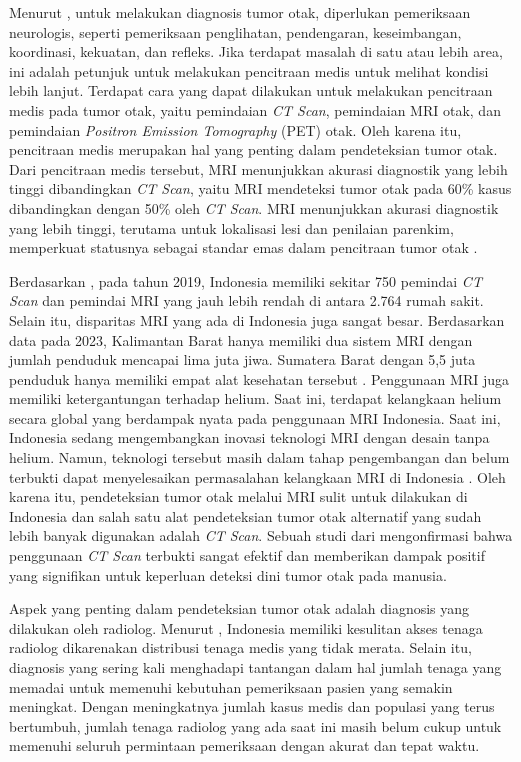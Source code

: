Menurut \textcite{mayoclinic2019braintumor}, untuk melakukan diagnosis tumor otak, diperlukan pemeriksaan neurologis, seperti pemeriksaan penglihatan, pendengaran, keseimbangan, koordinasi, kekuatan, dan refleks. Jika terdapat masalah di satu atau lebih area, ini adalah petunjuk untuk melakukan pencitraan medis untuk melihat kondisi lebih lanjut. Terdapat cara yang dapat dilakukan untuk melakukan pencitraan medis pada tumor otak, yaitu pemindaian \textit{CT Scan}, pemindaian MRI otak, dan pemindaian \textit{Positron Emission Tomography} (PET) otak. Oleh karena itu, pencitraan medis merupakan hal yang penting dalam pendeteksian tumor otak. Dari pencitraan medis tersebut, MRI menunjukkan akurasi diagnostik yang lebih tinggi dibandingkan \textit{CT Scan}, yaitu MRI mendeteksi tumor otak pada 60\% kasus dibandingkan dengan 50\% oleh \textit{CT Scan}. MRI menunjukkan akurasi diagnostik yang lebih tinggi, terutama untuk lokalisasi lesi dan penilaian parenkim, memperkuat statusnya sebagai standar emas dalam pencitraan tumor otak \cite{jaffar2025comparative}.

Berdasarkan \textcite{medtech2020hospitalintelligence}, pada tahun 2019, Indonesia memiliki sekitar 750 pemindai \textit{CT Scan} dan pemindai MRI yang jauh lebih rendah di antara 2.764 rumah sakit. Selain itu, disparitas MRI yang ada di Indonesia juga sangat besar. Berdasarkan data pada 2023, Kalimantan Barat hanya memiliki dua sistem MRI dengan jumlah penduduk mencapai lima juta jiwa. Sumatera Barat dengan 5,5 juta penduduk hanya memiliki empat alat kesehatan tersebut \cite{purnama2025disparitas}. Penggunaan MRI juga memiliki ketergantungan terhadap helium. Saat ini, terdapat kelangkaan helium secara global yang berdampak nyata pada penggunaan MRI Indonesia. Saat ini, Indonesia sedang mengembangkan inovasi teknologi MRI dengan desain tanpa helium. Namun, teknologi tersebut masih dalam tahap pengembangan dan belum terbukti dapat menyelesaikan permasalahan kelangkaan MRI di Indonesia \cite{permana2025kelangkaan}. Oleh karena itu, pendeteksian tumor otak melalui MRI sulit untuk dilakukan di Indonesia dan salah satu alat pendeteksian tumor otak alternatif yang sudah lebih banyak digunakan adalah \textit{CT Scan}. Sebuah studi dari \textcite{budiman2024effectiveness} mengonfirmasi bahwa penggunaan \textit{CT Scan} terbukti sangat efektif dan memberikan dampak positif yang signifikan untuk keperluan deteksi dini tumor otak pada manusia.

Aspek yang penting dalam pendeteksian tumor otak adalah diagnosis yang dilakukan oleh radiolog. Menurut \textcite{nuraini2024kesulitan}, Indonesia memiliki kesulitan akses tenaga radiolog dikarenakan distribusi tenaga medis yang tidak merata. Selain itu, diagnosis yang sering kali menghadapi tantangan dalam hal jumlah tenaga yang memadai untuk memenuhi kebutuhan pemeriksaan pasien yang semakin meningkat. Dengan meningkatnya jumlah kasus medis dan populasi yang terus bertumbuh, jumlah tenaga radiolog yang ada saat ini masih belum cukup untuk memenuhi seluruh permintaan pemeriksaan dengan akurat dan tepat waktu.


